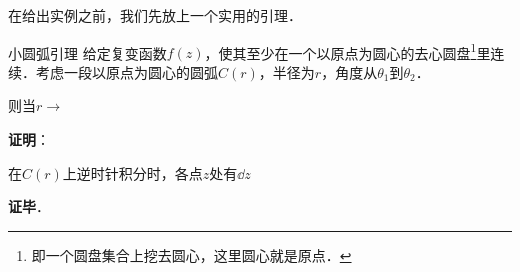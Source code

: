在给出实例之前，我们先放上一个实用的引理．

\begin{lemma}{小圆弧引理}
给定复变函数$f(z)$，使其至少在一个以原点为圆心的去心圆盘\footnote{即一个圆盘集合上挖去圆心，这里圆心就是原点．}里连续．考虑一段以原点为圆心的圆弧$C(r)$，半径为$r$，角度从$\theta_1$到$\theta_2$．

则当$r\to$



\end{lemma}


\textbf{证明}：

在$C(r)$上逆时针积分时，各点$z$处有$\dd z$

\textbf{证毕}．











